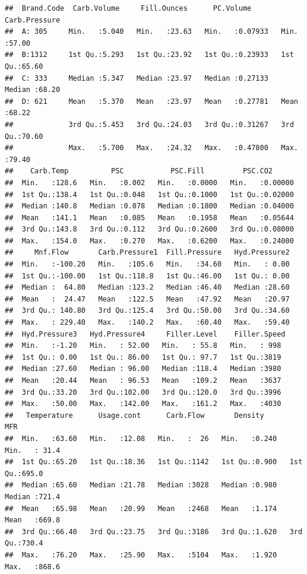 \documentclass[]{article}
\begin{document}
\begin{verbatim}
##  Brand.Code  Carb.Volume     Fill.Ounces      PC.Volume       Carb.Pressure  
##  A: 305     Min.   :5.040   Min.   :23.63   Min.   :0.07933   Min.   :57.00  
##  B:1312     1st Qu.:5.293   1st Qu.:23.92   1st Qu.:0.23933   1st Qu.:65.60  
##  C: 333     Median :5.347   Median :23.97   Median :0.27133   Median :68.20  
##  D: 621     Mean   :5.370   Mean   :23.97   Mean   :0.27781   Mean   :68.22  
##             3rd Qu.:5.453   3rd Qu.:24.03   3rd Qu.:0.31267   3rd Qu.:70.60  
##             Max.   :5.700   Max.   :24.32   Max.   :0.47800   Max.   :79.40  
##    Carb.Temp          PSC           PSC.Fill         PSC.CO2       
##  Min.   :128.6   Min.   :0.002   Min.   :0.0000   Min.   :0.00000  
##  1st Qu.:138.4   1st Qu.:0.048   1st Qu.:0.1000   1st Qu.:0.02000  
##  Median :140.8   Median :0.078   Median :0.1800   Median :0.04000  
##  Mean   :141.1   Mean   :0.085   Mean   :0.1958   Mean   :0.05644  
##  3rd Qu.:143.8   3rd Qu.:0.112   3rd Qu.:0.2600   3rd Qu.:0.08000  
##  Max.   :154.0   Max.   :0.270   Max.   :0.6200   Max.   :0.24000  
##     Mnf.Flow       Carb.Pressure1  Fill.Pressure   Hyd.Pressure2  
##  Min.   :-100.20   Min.   :105.6   Min.   :34.60   Min.   : 0.00  
##  1st Qu.:-100.00   1st Qu.:118.8   1st Qu.:46.00   1st Qu.: 0.00  
##  Median :  64.80   Median :123.2   Median :46.40   Median :28.60  
##  Mean   :  24.47   Mean   :122.5   Mean   :47.92   Mean   :20.97  
##  3rd Qu.: 140.80   3rd Qu.:125.4   3rd Qu.:50.00   3rd Qu.:34.60  
##  Max.   : 229.40   Max.   :140.2   Max.   :60.40   Max.   :59.40  
##  Hyd.Pressure3   Hyd.Pressure4     Filler.Level    Filler.Speed 
##  Min.   :-1.20   Min.   : 52.00   Min.   : 55.8   Min.   : 998  
##  1st Qu.: 0.00   1st Qu.: 86.00   1st Qu.: 97.7   1st Qu.:3819  
##  Median :27.60   Median : 96.00   Median :118.4   Median :3980  
##  Mean   :20.44   Mean   : 96.53   Mean   :109.2   Mean   :3637  
##  3rd Qu.:33.20   3rd Qu.:102.00   3rd Qu.:120.0   3rd Qu.:3996  
##  Max.   :50.00   Max.   :142.00   Max.   :161.2   Max.   :4030  
##   Temperature      Usage.cont      Carb.Flow       Density           MFR       
##  Min.   :63.60   Min.   :12.08   Min.   :  26   Min.   :0.240   Min.   : 31.4  
##  1st Qu.:65.20   1st Qu.:18.36   1st Qu.:1142   1st Qu.:0.900   1st Qu.:695.0  
##  Median :65.60   Median :21.78   Median :3028   Median :0.980   Median :721.4  
##  Mean   :65.98   Mean   :20.99   Mean   :2468   Mean   :1.174   Mean   :669.8  
##  3rd Qu.:66.40   3rd Qu.:23.75   3rd Qu.:3186   3rd Qu.:1.620   3rd Qu.:730.4  
##  Max.   :76.20   Max.   :25.90   Max.   :5104   Max.   :1.920   Max.   :868.6  

\end{verbatim}
\end{document}
